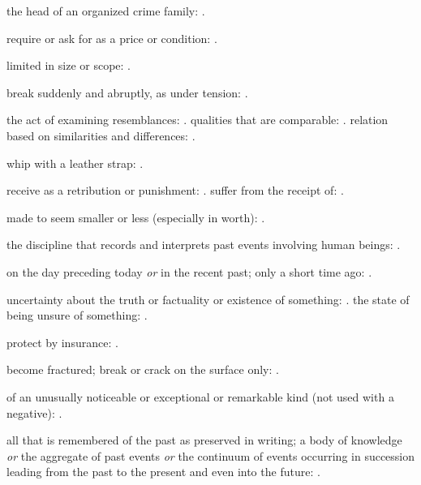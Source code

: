   the head of an organized crime family:   .

  require or ask for as a price or condition: .

  limited in size or scope:   .

  break suddenly and abruptly, as under tension:   .

  the act of examining resemblances:   . qualities that are comparable:   . relation based on similarities and differences: .

  whip with a leather strap: .

  receive as a retribution or punishment:   . suffer from the receipt of:   .

  made to seem smaller or less (especially in worth):   .

  the discipline that records and interprets past events involving human beings: .

  on the day preceding today \textit{or} in the recent past; only a short time ago: .

  uncertainty about the truth or factuality or existence of something:   . the state of being unsure of something:   .

  protect by insurance:   .

  become fractured; break or crack on the surface only:   .

  of an unusually noticeable or exceptional or remarkable kind (not used with a negative):   .

  all that is remembered of the past as preserved in writing; a body of knowledge \textit{or} the aggregate of past events \textit{or} the continuum of events occurring in succession leading from the past to the present and even into the future: .


